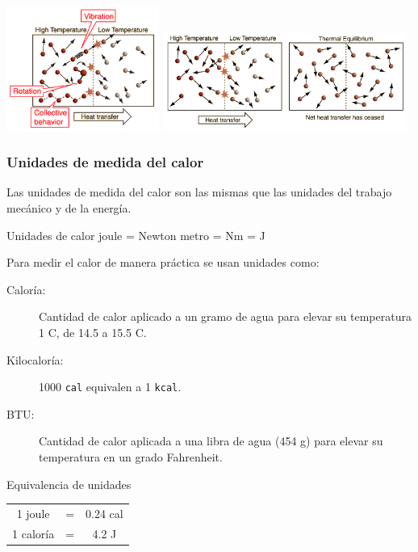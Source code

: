 \documentclass[handout]{beamer}
\begin{document}
\begin{frame}
  \begin{center}
    \includegraphics[width=5cm]{templowhigh1}
    \newline
    \includegraphics[width=8cm]{templowhigh}
  \end{center}
\end{frame}





\begin{frame}
  \frametitle{Unidades de medida del calor}
Las unidades de medida del calor son las mismas que las unidades del trabajo mecánico y de
la energía.
\begin{block}{Unidades de calor}
  joule = Newton metro = Nm = J
\end{block}



Para medir el calor de manera práctica se usan unidades como:
\begin{description}
\item[Caloría:] Cantidad de calor aplicado a un gramo de agua para elevar su temperatura 1
  \textdegree C, de 14.5 a 15.5 \textdegree C.
\item[Kilocaloría:] 1000 \texttt{cal} equivalen a 1 \texttt{kcal}.
\item[BTU:] Cantidad de calor aplicada a una libra de agua (454 g) para elevar su
  temperatura en un grado Fahrenheit.
\end{description}

\begin{block}{Equivalencia de unidades}
  \begin{tabular}[h]{ccc}
    1 joule & = & 0.24 cal \\
    1 caloría & = & 4.2 J \\
  \end{tabular}
\end{block}
\end{frame}
\end{document}
